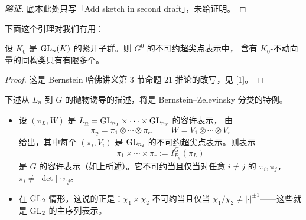 \begin{proof}[略证]
底本此处只写「Add sketch in second draft」，未给证明。
\end{proof}

下面这个引理对我们有用：

\begin{lemma}
设 $K_0$ 是 $\mathrm{GL}_n(K)$ 的紧开子群。则 $G^{0}$ 的不可约超尖点表示中，
含有 $K_0$-不动向量的同构类只有有限多个。
\end{lemma}

\begin{proof}
这是 Bernstein 哈佛讲义第 3 节命题 21 推论的改写，见 [1]。
\end{proof}

\begin{remark}
下述从 $L_{\underline n}$ 到 $G$ 的抛物诱导的描述，将是 Bernstein--Zelevinsky 分类的特例。
\begin{itemize}[leftmargin=1.6em]
\item 设 $(\pi_L,W)$ 是 $L_{\underline n}=\mathrm{GL}_{n_1}\times\cdots\times\mathrm{GL}_{n_r}$ 的容许表示，
      由
\[
\pi_{\underline n}=\pi_1\otimes\cdots\otimes\pi_r,\qquad
W=V_1\otimes\cdots\otimes V_r
\]
给出，其中每个 $(\pi_i,V_i)$ 是 $\mathrm{GL}_{n_i}$ 的不可约超尖点表示。则表示
\[
\pi_1\times\cdots\times\pi_r:=I^G_{P_{\underline n}}(\pi_L)
\]
是 $G$ 的容许表示（如上所述）。它不可约当且仅当对任意 $i\neq j$ 的 $\pi_i,\pi_j$，
$\pi_i\neq|\det|\cdot\pi_j$。
\item 在 $\mathrm{GL}_2$ 情形，这说的正是：$\chi_1\times\chi_2$ 不可约当且仅当
      $\chi_1/\chi_2\neq|\cdot|^{\pm 1}$——这些就是 $\mathrm{GL}_2$ 的主序列表示。
\end{itemize}
\end{remark}
